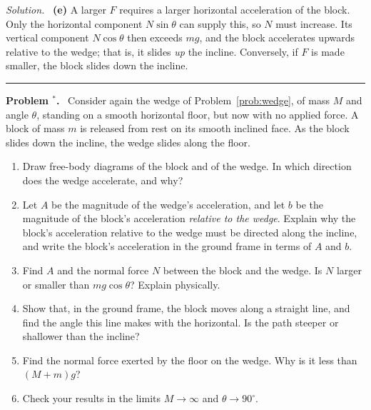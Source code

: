 \documentclass[12pt]{article}
\newcounter{problem}
\newenvironment{problem}[1][]{\refstepcounter{problem}\par\medskip\noindent\textbf{Problem \theproblem#1.}\ }{\par}
\newenvironment{solution}{\par\noindent\textit{Solution.}\ }{\hfill\rule{0.55em}{0.55em}\par}
\begin{document}
\begin{solution}
\textbf{(e)} A larger $F$ requires a larger horizontal acceleration of the block. Only the horizontal component $N\sin\theta$ can supply this, so $N$ must increase. Its vertical component $N\cos\theta$ then exceeds $mg$, and the block accelerates upwards relative to the wedge; that is, it slides \emph{up} the incline. Conversely, if $F$ is made smaller, the block slides down the incline.
\end{solution}

\begin{problem}[$^\ast$]\label{prob:freewedge}
Consider again the wedge of Problem~\ref{prob:wedge}, of mass $M$ and angle $\theta$, standing on a smooth horizontal floor, but now with no applied force. A block of mass $m$ is released from rest on its smooth inclined face. As the block slides down the incline, the wedge slides along the floor.

\begin{center}
\end{center}

\begin{enumerate}[label=(\alph*)]
  \item Draw free-body diagrams of the block and of the wedge. In which direction does the wedge accelerate, and why?
  \item Let $A$ be the magnitude of the wedge's acceleration, and let $b$ be the magnitude of the block's acceleration \emph{relative to the wedge}. Explain why the block's acceleration relative to the wedge must be directed along the incline, and write the block's acceleration in the ground frame in terms of $A$ and $b$.
  \item Find $A$ and the normal force $N$ between the block and the wedge. Is $N$ larger or smaller than $mg\cos\theta$? Explain physically.
  \item Show that, in the ground frame, the block moves along a straight line, and find the angle this line makes with the horizontal. Is the path steeper or shallower than the incline?
  \item Find the normal force exerted by the floor on the wedge. Why is it less than $(M + m)g$?
  \item Check your results in the limits $M \to \infty$ and $\theta \to 90^\circ$.
\end{enumerate}
\end{problem}
\end{document}

